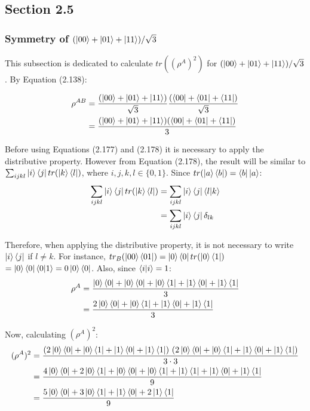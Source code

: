 \subsection{Section 2.5}
\subsubsection{Symmetry of $(\ket{00} + \ket{01} + \ket{11})/\sqrt{3}$}

This subsection is dedicated to calculate $tr((\rho^A)^2)$
for $(\ket{00} + \ket{01} + \ket{11})/\sqrt{3}$. By Equation (2.138):

\begin{align}
    \rho^{AB} &= \frac{(\ket{00} + \ket{01} + \ket{11})}{\sqrt{3}}
        \frac{(\bra{00} + \bra{01} + \bra{11})}{\sqrt{3}} \\
        &= \frac{(\ket{00} + \ket{01} + \ket{11})(\bra{00} + \bra{01} + \bra{11})}{3}
\end{align}

Before using Equations (2.177) and (2.178) it is necessary to apply the distributive property.
However from Equation (2.178), the result will be similar to
$\sum_{ijkl} \ket{i}\bra{j} tr(\ket{k}\bra{l})$, where $i, j, k, l \in \{0, 1\}$.
Since $tr(\ket{a}\bra{b}) = \bra{b}\ket{a}$:
\begin{align}
    \sum_{ijkl} \ket{i}\bra{j} tr(\ket{k}\bra{l}) &=
        \sum_{ijkl} \ket{i}\bra{j}\braket{l|k} \\
        &= \sum_{ijkl} \ket{i}\bra{j}\delta_{lk}
\end{align}

Therefore, when applying the distributive property,
it is not necessary to write $\ket{i}\bra{j}$ if $l \neq k$.
For instance,
$tr_B(\ket{00}\bra{01}) = \ket{0}\bra{0}tr(\ket{0}\bra{1})$
$= \ket{0}\bra{0}\braket{0|1} = 0 \ket{0}\bra{0}$.
Also, since $\braket{i|i} = 1$:
\begin{align}
    \rho^A &= \frac{\ket{0}\bra{0} + \ket{0}\bra{0} + \ket{0}\bra{1} +
        \ket{1}\bra{0} + \ket{1}\bra{1}}{3} \\
    &= \frac{2\ket{0}\bra{0} + \ket{0}\bra{1} +
        \ket{1}\bra{0} + \ket{1}\bra{1}}{3}
\end{align}

Now, calculating $(\rho^A)^2$:
\begin{align}
    (\rho^A)^2 &= \frac{(2\ket{0}\bra{0} + \ket{0}\bra{1} +
        \ket{1}\bra{0} + \ket{1}\bra{1})\ (2\ket{0}\bra{0} + \ket{0}\bra{1} +
        \ket{1}\bra{0} + \ket{1}\bra{1})}{3 \cdot 3} \\
    &= \frac{4\ket{0}\bra{0} + 2\ket{0}\bra{1} + \ket{0}\bra{0} + \ket{0}\bra{1} +
        \ket{1}\bra{1} + \ket{1}\bra{0} + \ket{1}\bra{1}}{9} \\
    &= \frac{5\ket{0}\bra{0} + 3\ket{0}\bra{1} + \ket{1}\bra{0} + 2\ket{1}\bra{1}}{9}
\end{align}

